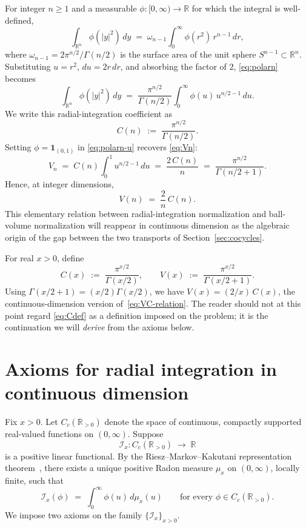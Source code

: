 \documentclass[11pt,a4paper]{article}
\theoremstyle{plain}
\theoremstyle{definition}
\theoremstyle{remark}
\newcommand{\R}{\mathbb{R}}
\newcommand{\Cc}{C_c}
\newcommand{\Iop}{\mathcal{I}}
\begin{document}
For integer $n\ge 1$ and a measurable $\phi:[0,\infty)\to\R$ for which the integral is well-defined,
\begin{equation}\label{eq:polarn}
\int_{\R^n}\phi(|y|^2)\,dy \;=\; \omega_{n-1}\int_0^\infty \phi(r^2)\,r^{n-1}\,dr,
\end{equation}
where $\omega_{n-1}=2\pi^{n/2}/\Gamma(n/2)$ is the surface area of the unit sphere $S^{n-1}\subset\R^n$. Substituting $u=r^2$, $du=2r\,dr$, and absorbing the factor of $2$, \eqref{eq:polarn} becomes
\begin{equation}\label{eq:polarn-u}
\int_{\R^n}\phi(|y|^2)\,dy \;=\; \frac{\pi^{n/2}}{\Gamma(n/2)}\int_0^\infty \phi(u)\,u^{n/2-1}\,du.
\end{equation}
We write this radial-integration coefficient as
\[
C(n) \;:=\; \frac{\pi^{n/2}}{\Gamma(n/2)}.
\]
Setting $\phi=\mathbf 1_{(0,1)}$ in \eqref{eq:polarn-u} recovers \eqref{eq:Vn}:
\[
V_n \;=\; C(n)\int_0^1 u^{n/2-1}\,du \;=\; \frac{2\,C(n)}{n} \;=\; \frac{\pi^{n/2}}{\Gamma(n/2+1)}.
\]
Hence, at integer dimensions,
\begin{equation}\label{eq:VC-relation}
V(n) \;=\; \frac{2}{n}\,C(n).
\end{equation}
This elementary relation between radial-integration normalization and ball-volume normalization will reappear in continuous dimension as the algebraic origin of the gap between the two transports of Section~\ref{sec:cocycles}.

For real $x>0$, define
\begin{equation}\label{eq:Cdef}
C(x) \;:=\; \frac{\pi^{x/2}}{\Gamma(x/2)}, \qquad V(x) \;:=\; \frac{\pi^{x/2}}{\Gamma(x/2+1)}.
\end{equation}
Using $\Gamma(x/2+1) = (x/2)\Gamma(x/2)$, we have $V(x)=(2/x)\,C(x)$, the continuous-dimension version of~\eqref{eq:VC-relation}. The reader should not at this point regard \eqref{eq:Cdef} as a definition imposed on the problem; it is the continuation we will \emph{derive} from the axioms below.

\section{Axioms for radial integration in continuous dimension}\label{sec:axioms}

Fix $x>0$. Let $\Cc(\R_{>0})$ denote the space of continuous, compactly supported real-valued functions on $(0,\infty)$. Suppose
\[
\Iop_x\colon \Cc(\R_{>0})\;\longrightarrow\;\R
\]
is a positive linear functional. By the Riesz--Markov--Kakutani representation theorem~\cite[Thm.~7.2]{Folland1999}, there exists a unique positive Radon measure $\mu_x$ on $(0,\infty)$, locally finite, such that
\[
\Iop_x(\phi) \;=\; \int_0^\infty \phi(u)\,d\mu_x(u) \qquad\text{for every } \phi\in\Cc(\R_{>0}).
\]
We impose two axioms on the family $\{\Iop_x\}_{x>0}$.
\end{document}
